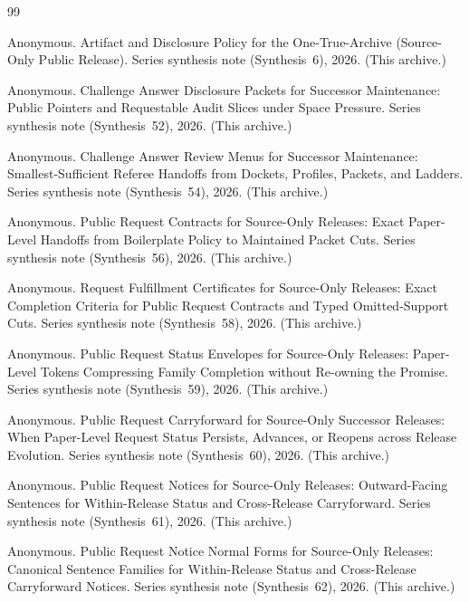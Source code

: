 \documentclass[11pt]{article}
\begin{document}
\begin{thebibliography}{99}\small

Anonymous.
\newblock Artifact and Disclosure Policy for the One-True-Archive (Source-Only Public Release).
\newblock Series synthesis note (Synthesis~6), 2026. (This archive.)

Anonymous.
\newblock Challenge Answer Disclosure Packets for Successor Maintenance: Public Pointers and Requestable Audit Slices under Space Pressure.
\newblock Series synthesis note (Synthesis~52), 2026. (This archive.)

Anonymous.
\newblock Challenge Answer Review Menus for Successor Maintenance: Smallest-Sufficient Referee Handoffs from Dockets, Profiles, Packets, and Ladders.
\newblock Series synthesis note (Synthesis~54), 2026. (This archive.)

Anonymous.
\newblock Public Request Contracts for Source-Only Releases: Exact Paper-Level Handoffs from Boilerplate Policy to Maintained Packet Cuts.
\newblock Series synthesis note (Synthesis~56), 2026. (This archive.)


Anonymous.
\newblock Request Fulfillment Certificates for Source-Only Releases: Exact Completion Criteria for Public Request Contracts and Typed Omitted-Support Cuts.
\newblock Series synthesis note (Synthesis~58), 2026. (This archive.)

Anonymous.
\newblock Public Request Status Envelopes for Source-Only Releases: Paper-Level Tokens Compressing Family Completion without Re-owning the Promise.
\newblock Series synthesis note (Synthesis~59), 2026. (This archive.)

Anonymous.
\newblock Public Request Carryforward for Source-Only Successor Releases: When Paper-Level Request Status Persists, Advances, or Reopens across Release Evolution.
\newblock Series synthesis note (Synthesis~60), 2026. (This archive.)

Anonymous.
\newblock Public Request Notices for Source-Only Releases: Outward-Facing Sentences for Within-Release Status and Cross-Release Carryforward.
\newblock Series synthesis note (Synthesis~61), 2026. (This archive.)

Anonymous.
\newblock Public Request Notice Normal Forms for Source-Only Releases: Canonical Sentence Families for Within-Release Status and Cross-Release Carryforward Notices.
\newblock Series synthesis note (Synthesis~62), 2026. (This archive.)


\end{thebibliography}
\end{document}
